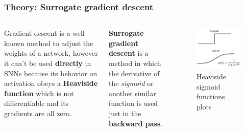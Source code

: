 \begin{frame}
	\frametitle{Theory: Surrogate gradient descent}
		\begin{columns}
			\par Gradient descent is a well known method to adjust the weights of a network, however it can't be used \textbf{directly} in SNNs because its behavior on activation obeys a \textbf{Heaviside function} which is not differentiable and its gradients are all zero.\newline
			
			\par \textbf{Surrogate gradient descent} is a method in which the derivative of the \textit{sigmoid} or another similar function is used just in the \textbf{backward pass}.
			
			
			\begin{figure}
				\centering
				\includegraphics[width=0.9\linewidth]{images/heavisideSigmoid}
				\caption{Heaviside sigmoid functions plots}
				\label{fig:heavisidesigmoid}
			\end{figure}
	\end{columns}
\end{frame}

